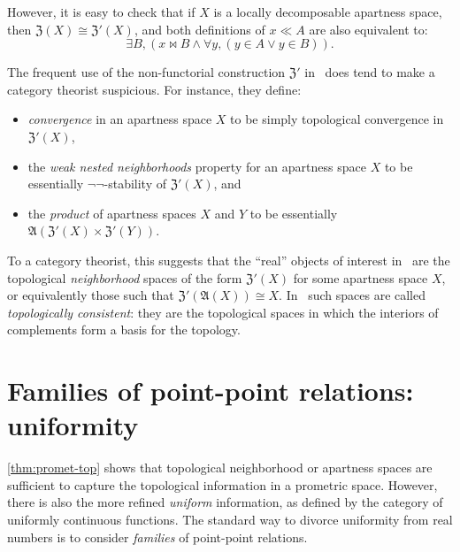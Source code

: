 \documentclass{article}
\let\implies\Rightarrow
\def\anti{\mathfrak{A}}
\def\neigh{\mathfrak{Z}}
\def\nn{\ensuremath{\neg\neg}}
\begin{document}
However, it is easy to check that if $X$ is a locally decomposable apartness space, then $\neigh(X) \cong \neigh'(X)$, and both definitions of $x\ll A$ are also equivalent to:
\begin{equation}
  \exists B, (x\bowtie B \land \forall y, (y\in A \lor y\in B)).\label{eq:top-bowtie-ll-2}
\end{equation}

\begin{rmk}
  The frequent use of the non-functorial construction $\neigh'$ in~\cite[Chapter 2]{bridges-vita} does tend to make a category theorist suspicious.
  For instance, they define:
  \begin{itemize}
  \item \emph{convergence} in an apartness space $X$ to be simply topological convergence in $\neigh'(X)$,
  \item the \emph{weak nested neighborhoods} property for an apartness space $X$ to be essentially \nn-stability of $\neigh'(X)$, and
  \item the \emph{product} of apartness spaces $X$ and $Y$ to be essentially $\anti(\neigh'(X) \times \neigh'(Y))$.
  \end{itemize}
  To a category theorist, this suggests that the ``real'' objects of interest in~\cite[Chapter 2]{bridges-vita} are the topological \emph{neighborhood} spaces of the form $\neigh'(X)$ for some apartness space $X$, or equivalently those such that $\neigh'(\anti(X))\cong X$.
  In~\cite{bridges-vita} such spaces are called \emph{topologically consistent}: they are the topological spaces in which the interiors of complements form a basis for the topology.
\end{rmk}


\section{Families of point-point relations: uniformity}
\label{sec:uniformity}

\cref{thm:promet-top} shows that topological neighborhood or apartness spaces are sufficient to capture the topological information in a prometric space.
However, there is also the more refined \emph{uniform} information, as defined by the category of uniformly continuous functions.
The standard way to divorce uniformity from real numbers is to consider \emph{families} of point-point relations.
\end{document}
